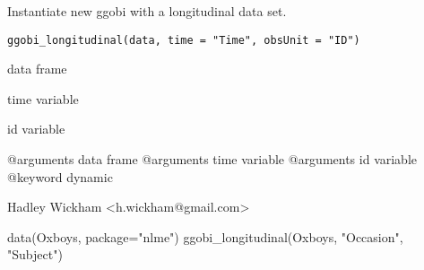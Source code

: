 \documentclass{article}
\begin{document}
\begin{Description}\relax
Instantiate new ggobi with a longitudinal data set.
\end{Description}
\begin{Usage}
\begin{verbatim}ggobi_longitudinal(data, time = "Time", obsUnit = "ID")\end{verbatim}
\end{Usage}
\begin{Arguments}
\begin{ldescription}
\item[\code{data}] data frame
\item[\code{time}] time variable
\item[\code{obsUnit}] id variable
\end{ldescription}
\end{Arguments}
\begin{Details}\relax
@arguments data frame
@arguments time variable
@arguments id variable
@keyword dynamic
\end{Details}
\begin{Author}\relax
Hadley Wickham <h.wickham@gmail.com>
\end{Author}
\begin{Examples}
\begin{ExampleCode}data(Oxboys, package="nlme")
ggobi_longitudinal(Oxboys, "Occasion", "Subject")\end{ExampleCode}
\end{Examples}
\end{document}
